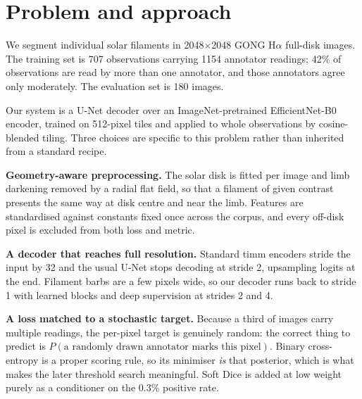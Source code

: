 %

\section{Problem and approach}

We segment individual solar filaments in 2048$\times$2048 GONG H$\alpha$
full-disk images. The training set is 707 observations carrying 1154 annotator
readings; 42\% of observations are read by more than one annotator, and those
annotators agree only moderately. The evaluation set is 180 images.

Our system is a U-Net decoder over an ImageNet-pretrained EfficientNet-B0
encoder, trained on 512-pixel tiles and applied to whole observations by
cosine-blended tiling. Three choices are specific to this problem rather than
inherited from a standard recipe.

\textbf{Geometry-aware preprocessing.} The solar disk is fitted per image and
limb darkening removed by a radial flat field, so that a filament of given
contrast presents the same way at disk centre and near the limb. Features are
standardised against constants fixed once across the corpus, and every
off-disk pixel is excluded from both loss and metric.

\textbf{A decoder that reaches full resolution.} Standard timm encoders stride
the input by 32 and the usual U-Net stops decoding at stride 2, upsampling
logits at the end. Filament barbs are a few pixels wide, so our decoder runs
back to stride 1 with learned blocks and deep supervision at strides 2 and 4.

\textbf{A loss matched to a stochastic target.} Because a third of images carry
multiple readings, the per-pixel target is genuinely random: the correct thing
to predict is $P(\text{a randomly drawn annotator marks this pixel})$. Binary
cross-entropy is a proper scoring rule, so its minimiser \emph{is} that
posterior, which is what makes the later threshold search meaningful. Soft Dice
is added at low weight purely as a conditioner on the 0.3\% positive rate.

